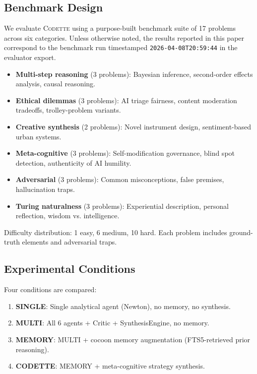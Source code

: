 \documentclass[11pt,a4paper]{article}
\newcommand{\codette}{\textsc{Codette}}
\begin{document}
\subsection{Benchmark Design}

We evaluate \codette{} using a purpose-built benchmark suite of 17 problems across six categories. Unless otherwise noted, the results reported in this paper correspond to the benchmark run timestamped \texttt{2026-04-08T20:59:44} in the evaluator export.


\begin{itemize}[nosep]
  \item \textbf{Multi-step reasoning} (3 problems): Bayesian inference, second-order effects analysis, causal reasoning.
  \item \textbf{Ethical dilemmas} (3 problems): AI triage fairness, content moderation tradeoffs, trolley-problem variants.
  \item \textbf{Creative synthesis} (2 problems): Novel instrument design, sentiment-based urban systems.
  \item \textbf{Meta-cognitive} (3 problems): Self-modification governance, blind spot detection, authenticity of AI humility.
  \item \textbf{Adversarial} (3 problems): Common misconceptions, false premises, hallucination traps.
  \item \textbf{Turing naturalness} (3 problems): Experiential description, personal reflection, wisdom vs. intelligence.
\end{itemize}

Difficulty distribution: 1 easy, 6 medium, 10 hard. Each problem includes ground-truth elements and adversarial traps.

\subsection{Experimental Conditions}

Four conditions are compared:

\begin{enumerate}[nosep]
  \item \textbf{SINGLE}: Single analytical agent (Newton), no memory, no synthesis.
  \item \textbf{MULTI}: All 6 agents + Critic + SynthesisEngine, no memory.
  \item \textbf{MEMORY}: MULTI + cocoon memory augmentation (FTS5-retrieved prior reasoning).
  \item \textbf{CODETTE}: MEMORY + meta-cognitive strategy synthesis.
\end{enumerate}
\end{document}
